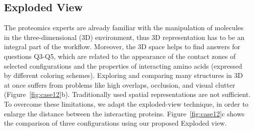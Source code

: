 \documentclass{bmcart}
\def\ExpView {Exploded view\xspace}
\def\MatView {Matrix view\xspace}
\begin{document}









\subsection*{Exploded View}
The proteomics experts are already familiar with the manipulation of molecules in the three-dimensional (3D) environment, thus 3D representation has to be an integral part of the workflow.
Moreover, the 3D space helps to find answers for questions Q3-Q5, which are related to the appearance of the contact zones of selected configurations and the properties of interacting amino acids (expressed by different coloring schemes).
Exploring and comparing many structures in 3D at once suffers from problems like high overlaps, occlusion, and visual clutter (Figure~\ref{fig:case12}b). 
Traditionally used spatial representations are not sufficient.
To overcome these limitations, we adapt the exploded-view technique, in order to enlarge the distance between the interacting proteins. 
Figure~\ref{fig:case12}c shows the comparison of three configurations using our proposed \ExpView.
\end{document}
